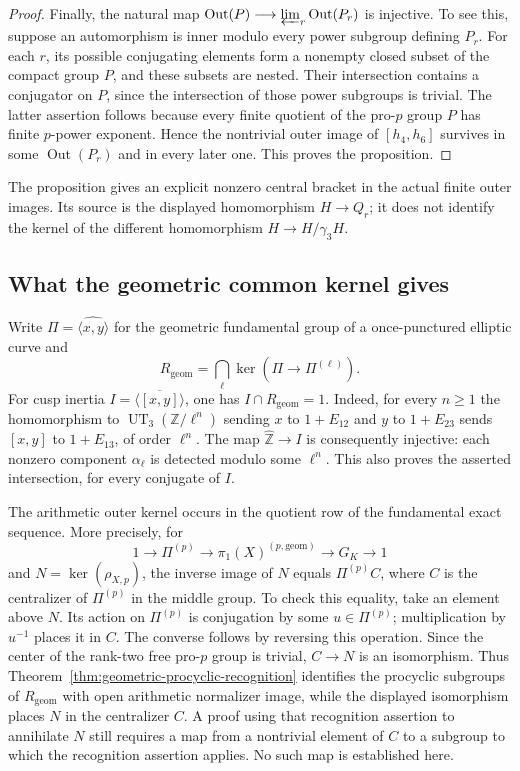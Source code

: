 \documentclass[11pt]{article}
\theoremstyle{definition}\newtheorem{definition}[theorem]{Definition}
\begin{document}
\begin{proof}
Finally, the natural map
\(\operatorname{Out}(P)\longrightarrow
 \varprojlim_r\operatorname{Out}(P_r)\) is injective.
To see this, suppose an automorphism is inner modulo every
power subgroup defining \(P_r\).  For each \(r\), its possible
conjugating elements form a nonempty closed subset of the
compact group \(P\), and these subsets are nested.
Their intersection contains a conjugator on \(P\), since
the intersection of those power subgroups is trivial.
The latter assertion follows because every finite quotient of
the pro-\(p\) group \(P\) has finite \(p\)-power exponent.
Hence the nontrivial outer image of \([h_4,h_6]\) survives
in some \(\operatorname{Out}(P_r)\) and in every later one.
This proves the proposition.
\end{proof}

The proposition gives an explicit nonzero central bracket in
the actual finite outer images.  Its source is the displayed
homomorphism \(H\to Q_r\); it does not identify the kernel of
the different homomorphism \(H\to H/\gamma_3H\).


\subsection{What the geometric common kernel gives}
\label{subsec:cm-geometric-common-kernel}

Write \(\Pi=\widehat{\langle x,y\rangle}\) for the geometric
fundamental group of a once-punctured elliptic curve and
\[
 R_{\mathrm{geom}}=
 \bigcap_\ell\ker(\Pi\longrightarrow\Pi^{(\ell)}).
\]
For cusp inertia \(I=\overline{\langle[x,y]\rangle}\), one has
\(I\cap R_{\mathrm{geom}}=1\). Indeed, for every \(n\geq1\)
the homomorphism to \(\operatorname{UT}_3(\mathbb Z/\ell^n)\)
sending \(x\) to \(1+E_{12}\) and \(y\) to \(1+E_{23}\)
sends \([x,y]\) to \(1+E_{13}\), of order \(\ell^n\).
The map \(\widehat{\mathbb Z}\to I\) is consequently injective:
each nonzero component \(\alpha_\ell\) is detected modulo some
\(\ell^n\). This also proves the asserted intersection, for every
conjugate of \(I\).

The arithmetic outer kernel occurs in the quotient row of the
fundamental exact sequence. More precisely, for
\[
 1\longrightarrow\Pi^{(p)}\longrightarrow
 \pi_1(X)^{(p,\mathrm{geom})}\longrightarrow G_K\longrightarrow1
\]
and \(N=\ker(\rho_{X,p})\), the inverse image of \(N\) equals
\(\Pi^{(p)}C\), where \(C\) is the centralizer of \(\Pi^{(p)}\)
in the middle group. To check this equality, take an element
above \(N\). Its action on \(\Pi^{(p)}\) is conjugation by some
\(u\in\Pi^{(p)}\); multiplication by \(u^{-1}\) places it in \(C\).
The converse follows by reversing this operation.
Since the center of the rank-two free pro-\(p\) group is trivial,
\(C\to N\) is an isomorphism. Thus Theorem~\ref{thm:geometric-procyclic-recognition} identifies the
procyclic subgroups of \(R_{\mathrm{geom}}\) with open arithmetic
normalizer image, while the displayed isomorphism places \(N\)
in the centralizer \(C\). A proof using that
recognition assertion to annihilate \(N\) still requires a map
from a nontrivial element of \(C\) to a subgroup to which the
recognition assertion applies. No such map is established here.
\end{document}
